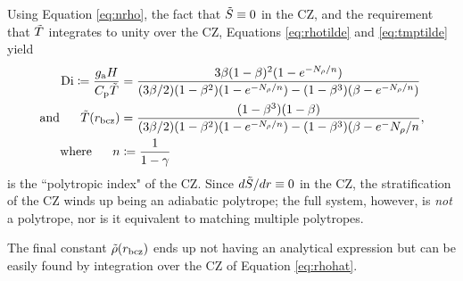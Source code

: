 \documentclass[12pt]{article}
\numberwithin{equation}{section}
\newcommand{\ga}{g_{\rm a}}
\begin{document}
Using Equation \eqref{eq:nrho}, the fact that $\tilde{S}\equiv0$ in the CZ, and the requirement that $\tilde{T}$ integrates to unity over the CZ, Equations \eqref{eq:rhotilde} and \eqref{eq:tmptilde} yield
\begin{align}\label{eq:digory}
	\di \define \frac{\ga H}{\cpcap\tilde{T}} &=  \frac{3 \beta (1 - \beta)^2 (1 - e^{-\nrho/n})} 
	{ (3\beta/2) (1 - \beta^2) (1 - e^{-\nrho/n}) - (1-\beta^3)(\beta-e^{-\nrho/n})}\\
	\andd \tmptilde(\rbcz)&= \frac{(1-\beta^3)(1-\beta)}{(3\beta/2)(1-\beta^2)(1-e^{-\nrho/n}) - (1-\beta^3)(\beta - e^-{\nrho/n}},\\
	\where n &\define \frac{1}{1-\gamma}
\end{align}
is the ``polytropic index" of the CZ. Since $d\tilde{S}/dr\equiv0$ in the CZ, the stratification of the CZ winds up being an adiabatic polytrope; the full system, however, is \textit{not} a polytrope, nor is it equivalent to matching multiple polytropes.

The final constant $\tilde{\rho}(r_{\rm bcz})$ ends up not having an analytical expression but can be easily found by integration over the CZ of Equation \eqref{eq:rhohat}.  


\clearpage
\newpage
%
	
\end{document}
